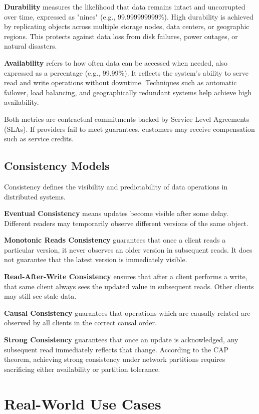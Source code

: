 \textbf{Durability} measures the likelihood that data remains intact and uncorrupted over time, expressed as "nines" (e.g., 99.999999999\%). High durability is achieved by replicating objects across multiple storage nodes, data centers, or geographic regions. This protects against data loss from disk failures, power outages, or natural disasters.

\textbf{Availability} refers to how often data can be accessed when needed, also expressed as a percentage (e.g., 99.99\%). It reflects the system's ability to serve read and write operations without downtime. Techniques such as automatic failover, load balancing, and geographically redundant systems help achieve high availability.

Both metrics are contractual commitments backed by Service Level Agreements (SLAs). If providers fail to meet guarantees, customers may receive compensation such as service credits.

\subsection{Consistency Models}

Consistency defines the visibility and predictability of data operations in distributed systems.

\textbf{Eventual Consistency} means updates become visible after some delay. Different readers may temporarily observe different versions of the same object.

\textbf{Monotonic Reads Consistency} guarantees that once a client reads a particular version, it never observes an older version in subsequent reads. It does not guarantee that the latest version is immediately visible.

\textbf{Read-After-Write Consistency} ensures that after a client performs a write, that same client always sees the updated value in subsequent reads. Other clients may still see stale data.

\textbf{Causal Consistency} guarantees that operations which are causally related are observed by all clients in the correct causal order.

\textbf{Strong Consistency} guarantees that once an update is acknowledged, any subsequent read immediately reflects that change. According to the CAP theorem, achieving strong consistency under network partitions requires sacrificing either availability or partition tolerance.

\section{Real-World Use Cases}\label{sec:use-cases}

